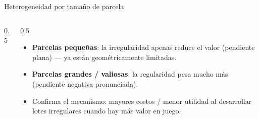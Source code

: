 \documentclass[11pt,aspectratio=169]{beamer}
\newcommand{\Gindex}{\textit{G-index}\xspace}
\begin{document}
\begin{frame}{Heterogeneidad por tamaño de parcela}
  \begin{columns}[T]
    \begin{column}{0.5\textwidth}
      \centering
    \end{column}
    \begin{column}{0.5\textwidth}
      \begin{itemize}\small
        \item \textbf{Parcelas pequeñas}: la irregularidad apenas reduce el valor (pendiente plana) — ya están geométricamente limitadas.
        \item \textbf{Parcelas grandes / valiosas}: la regularidad pesa mucho más (pendiente negativa pronunciada).
        \item Confirma el mecanismo: mayores costos / menor utilidad al desarrollar lotes irregulares cuando hay más valor en juego.
      \end{itemize}
    \end{column}
  \end{columns}
\end{frame}

\end{document}
